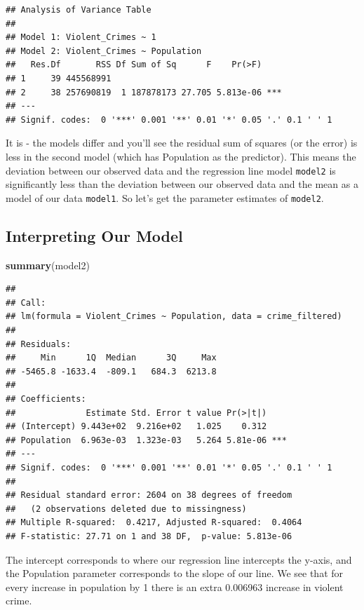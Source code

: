 \documentclass[
]{book}
\newenvironment{Shaded}{\begin{snugshade}}{\end{snugshade}}
\newcommand{\FunctionTok}[1]{\textcolor[rgb]{0.13,0.29,0.53}{\textbf{#1}}}
\newcommand{\NormalTok}[1]{#1}
\begin{document}
\begin{verbatim}
## Analysis of Variance Table
## 
## Model 1: Violent_Crimes ~ 1
## Model 2: Violent_Crimes ~ Population
##   Res.Df       RSS Df Sum of Sq      F    Pr(>F)    
## 1     39 445568991                                  
## 2     38 257690819  1 187878173 27.705 5.813e-06 ***
## ---
## Signif. codes:  0 '***' 0.001 '**' 0.01 '*' 0.05 '.' 0.1 ' ' 1
\end{verbatim}

It is - the models differ and you'll see the residual sum of squares (or the error) is less in the second model (which has Population as the predictor). This means the deviation between our observed data and the regression line model \texttt{model2} is significantly less than the deviation between our observed data and the mean as a model of our data \texttt{model1}. So let's get the parameter estimates of \texttt{model2}.

\hypertarget{interpreting-our-model}{%
\subsection{Interpreting Our Model}\label{interpreting-our-model}}

\begin{Shaded}
\begin{Highlighting}[]
\FunctionTok{summary}\NormalTok{(model2)}
\end{Highlighting}
\end{Shaded}

\begin{verbatim}
## 
## Call:
## lm(formula = Violent_Crimes ~ Population, data = crime_filtered)
## 
## Residuals:
##     Min      1Q  Median      3Q     Max 
## -5465.8 -1633.4  -809.1   684.3  6213.8 
## 
## Coefficients:
##              Estimate Std. Error t value Pr(>|t|)    
## (Intercept) 9.443e+02  9.216e+02   1.025    0.312    
## Population  6.963e-03  1.323e-03   5.264 5.81e-06 ***
## ---
## Signif. codes:  0 '***' 0.001 '**' 0.01 '*' 0.05 '.' 0.1 ' ' 1
## 
## Residual standard error: 2604 on 38 degrees of freedom
##   (2 observations deleted due to missingness)
## Multiple R-squared:  0.4217, Adjusted R-squared:  0.4064 
## F-statistic: 27.71 on 1 and 38 DF,  p-value: 5.813e-06
\end{verbatim}

The intercept corresponds to where our regression line intercepts the y-axis, and the Population parameter corresponds to the slope of our line. We see that for every increase in population by 1 there is an extra 0.006963 increase in violent crime.
\end{document}
